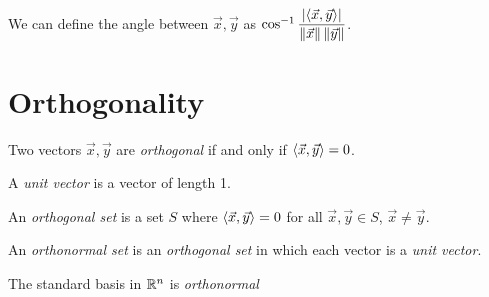 \begin{remark}
  We can define the angle between $\vec x, \vec y$ as
  $\cos^{-1} \dfrac{\left|\left\langle \vec x , \vec y \right\rangle\right|}{\left\lVert\vec x\right\rVert\left\lVert\vec y\right\rVert}$.
\end{remark}

\section{Orthogonality}
\begin{definition}[Orthogonality]
  Two vectors $\vec x, \vec y$ are \emph{orthogonal} if and only if $\left\langle \vec x , \vec y \right\rangle = 0$.
\end{definition}

\begin{definition}
  A \emph{unit vector} is a vector of length 1.
\end{definition}

\begin{definition}
  An \emph{orthogonal set} is a set $S$ where $\left\langle \vec x , \vec y \right\rangle = 0$ for all $\vec x, \vec y \in S$, $\vec x \ne \vec y$.
\end{definition}

\begin{definition}
  An \emph{orthonormal set} is an \emph{orthogonal set} in which each vector is a \emph{unit vector}.
\end{definition}

\begin{defexample}
  The standard basis in $\mathbb{R}^n$ is \emph{orthonormal}
\end{defexample}

